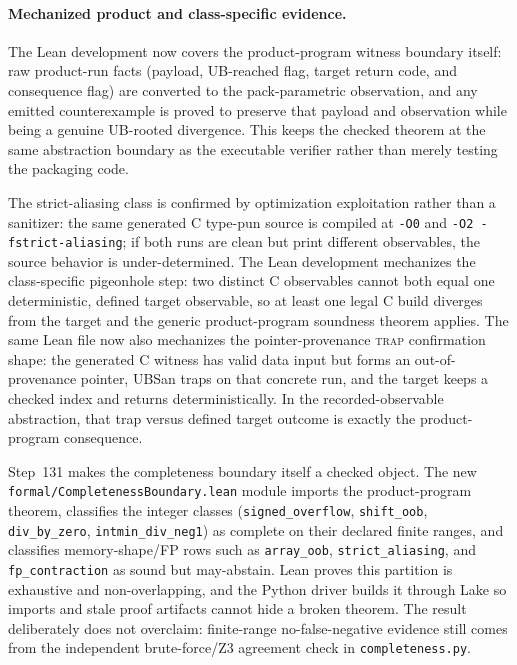 \documentclass[10pt,a4paper]{article}
\begin{document}
\paragraph{Mechanized product and class-specific evidence.}
The Lean development now covers the product-program witness boundary itself:
raw product-run facts (payload, UB-reached flag, target return code, and
consequence flag) are converted to the pack-parametric observation, and any
emitted counterexample is proved to preserve that payload and observation while
being a genuine UB-rooted divergence. This keeps the checked theorem at the same
abstraction boundary as the executable verifier rather than merely testing the
packaging code.

The strict-aliasing class is confirmed by optimization exploitation rather than
a sanitizer: the same generated C type-pun source is compiled at \texttt{-O0}
and \texttt{-O2 -fstrict-aliasing}; if both runs are clean but print different
observables, the source behavior is under-determined. The Lean development
mechanizes the class-specific pigeonhole step: two distinct C observables cannot
both equal one deterministic, defined target observable, so at least one legal C
build diverges from the target and the generic product-program soundness theorem
applies.  The same Lean file now also mechanizes the pointer-provenance
\textsc{trap} confirmation shape: the generated C witness has valid data input
but forms an out-of-provenance pointer, UBSan traps on that concrete run, and the
target keeps a checked index and returns deterministically.  In the
recorded-observable abstraction, that trap versus defined target outcome is
exactly the product-program consequence.

Step~131 makes the completeness boundary itself a checked object.  The new
\texttt{formal/CompletenessBoundary.lean} module imports the product-program
theorem, classifies the integer classes
(\texttt{signed\_overflow}, \texttt{shift\_oob}, \texttt{div\_by\_zero},
\texttt{intmin\_div\_neg1}) as complete on their declared finite ranges, and
classifies memory-shape/FP rows such as \texttt{array\_oob},
\texttt{strict\_aliasing}, and \texttt{fp\_contraction} as sound but
may-abstain.  Lean proves this partition is exhaustive and non-overlapping, and
the Python driver builds it through Lake so imports and stale proof artifacts
cannot hide a broken theorem.  The result deliberately does not overclaim:
finite-range no-false-negative evidence still comes from the independent
brute-force/Z3 agreement check in \texttt{completeness.py}.
\end{document}
